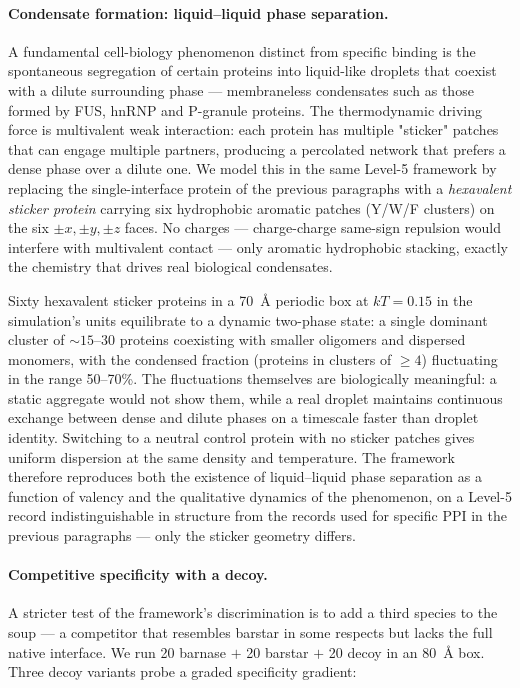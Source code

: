 \documentclass[11pt]{article}
\begin{document}
\paragraph{Condensate formation: liquid--liquid phase separation.}
A fundamental cell-biology phenomenon distinct from specific binding is the spontaneous segregation of certain proteins into liquid-like droplets that coexist with a dilute surrounding phase --- membraneless condensates such as those formed by FUS, hnRNP and P-granule proteins. The thermodynamic driving force is multivalent weak interaction: each protein has multiple "sticker" patches that can engage multiple partners, producing a percolated network that prefers a dense phase over a dilute one. We model this in the same Level-5 framework by replacing the single-interface protein of the previous paragraphs with a \emph{hexavalent sticker protein} carrying six hydrophobic aromatic patches (Y/W/F clusters) on the six $\pm x, \pm y, \pm z$ faces. No charges --- charge-charge same-sign repulsion would interfere with multivalent contact --- only aromatic hydrophobic stacking, exactly the chemistry that drives real biological condensates.

Sixty hexavalent sticker proteins in a 70~\AA{} periodic box at $kT = 0.15$ in the simulation's units equilibrate to a dynamic two-phase state: a single dominant cluster of $\sim 15$--$30$ proteins coexisting with smaller oligomers and dispersed monomers, with the condensed fraction (proteins in clusters of $\ge 4$) fluctuating in the range 50--70\%. The fluctuations themselves are biologically meaningful: a static aggregate would not show them, while a real droplet maintains continuous exchange between dense and dilute phases on a timescale faster than droplet identity. Switching to a neutral control protein with no sticker patches gives uniform dispersion at the same density and temperature. The framework therefore reproduces both the existence of liquid--liquid phase separation as a function of valency and the qualitative dynamics of the phenomenon, on a Level-5 record indistinguishable in structure from the records used for specific PPI in the previous paragraphs --- only the sticker geometry differs.

\paragraph{Competitive specificity with a decoy.}
A stricter test of the framework's discrimination is to add a third species to the soup --- a competitor that resembles barstar in some respects but lacks the full native interface. We run 20 barnase $+$ 20 barstar $+$ 20 decoy in an 80~\AA{} box. Three decoy variants probe a graded specificity gradient:
\end{document}
